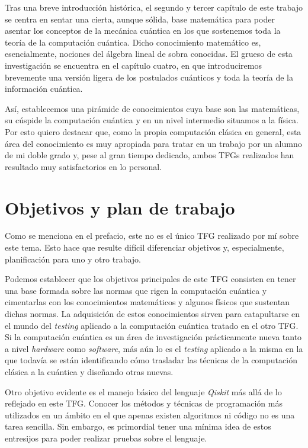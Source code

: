 Tras una breve introducción histórica, el segundo y tercer capítulo de este trabajo se centra en sentar una cierta, aunque sólida, base matemática para poder asentar los conceptos de la mecánica cuántica en los que sostenemos toda la teoría de la computación cuántica. Dicho conocimiento matemático es, esencialmente, nociones del álgebra lineal de sobra conocidas. El grueso de esta investigación se encuentra en el capítulo cuatro, en que introduciremos brevemente una versión ligera de los postulados cuánticos y toda la teoría de la información cuántica.

Así, establecemos una pirámide de conocimientos cuya base son las matemáticas, su cúspide la computación cuántica y en un nivel intermedio situamos a la física. Por esto quiero destacar que, como la propia computación clásica en general, esta área del conocimiento es muy apropiada para tratar en un trabajo por un alumno de mi doble grado y, pese al gran tiempo dedicado, ambos TFGs realizados han resultado muy satisfactorios en lo personal.

\chapter*{Objetivos y plan de trabajo}

Como se menciona en el prefacio, este no es el único TFG realizado por mí sobre este tema. Esto hace que resulte difícil diferenciar objetivos y, especialmente, planificación para uno y otro trabajo.

Podemos establecer que los objetivos principales de este TFG consisten en tener una base formada sobre las normas que rigen la computación cuántica y cimentarlas con los conocimientos matemáticos y algunos físicos que sustentan dichas normas. La adquisición de estos conocimientos sirven para catapultarse en el mundo del \textit{testing} aplicado a la computación cuántica tratado en el otro TFG. Si la computación cuántica es un área de investigación prácticamente nueva tanto a nivel \textit{hardware} como \textit{software}, más aún lo es el \textit{testing} aplicado a la misma en la que todavía se están identificando cómo trasladar las técnicas de la computación clásica a la cuántica y diseñando otras nuevas.

Otro objetivo evidente es el manejo básico del lenguaje \textit{Qiskit} más allá de lo reflejado en este TFG. Conocer los métodos y técnicas de programación más utilizados en un ámbito en el que apenas existen algoritmos ni código no es una tarea sencilla. Sin embargo, es primordial tener una mínima idea de estos entresijos para poder realizar pruebas sobre el lenguaje.


